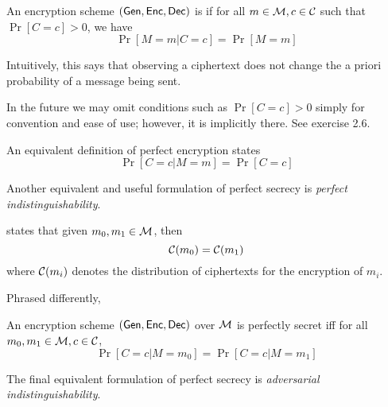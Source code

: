 \begin{definition}
    An encryption scheme $(\operatorname{\mathsf{Gen}}, \operatorname{\mathsf{Enc}}, \operatorname{\mathsf{Dec}})$ is  if for all $m \in \mathcal M, c \in \mathcal C$ such that $\Pr[C = c] > 0$, we have 
    \[ \Pr[M = m | C = c] = \Pr [M = m]\] %
\end{definition}

\begin{remark}
   Intuitively, this says that observing a ciphertext does not change the a priori probability of a message being sent. 
\end{remark}

\begin{remark}
    In the future we may omit conditions such as $\Pr[C = c] > 0$ simply for convention and ease of use; however, it is implicitly there. See exercise 2.6.
\end{remark}

\begin{lemma}
    An equivalent definition of perfect encryption states
    \[\Pr[C = c | M = m] = \Pr[C = c] \]
\end{lemma}

Another equivalent and useful formulation of perfect secrecy is \textit{perfect indistinguishability}. %
\begin{definition}
    states that given $m_0, m_1 \in \mathcal M$, then 
   \[\mathcal C(m_0) = \mathcal C(m_1) \]
   where $\mathcal C(m_i)$ denotes the distribution of ciphertexts for the encryption of $m_i$.
\end{definition}

Phrased differently,
\begin{lemma}
An encryption scheme $\operatorname{(\operatorname{\mathsf{Gen}}, \operatorname{\mathsf{Enc}}, \operatorname{\mathsf{Dec}})}$ over $\mathcal M$ is perfectly secret iff for all $m_0, m_1 \in \mathcal M, c \in \mathcal C$,
\[\Pr[C = c | M = m_0] = \Pr[C = c | M = m_1] \]
\end{lemma}

The final equivalent formulation of perfect secrecy is \textit{adversarial indistinguishability}.

